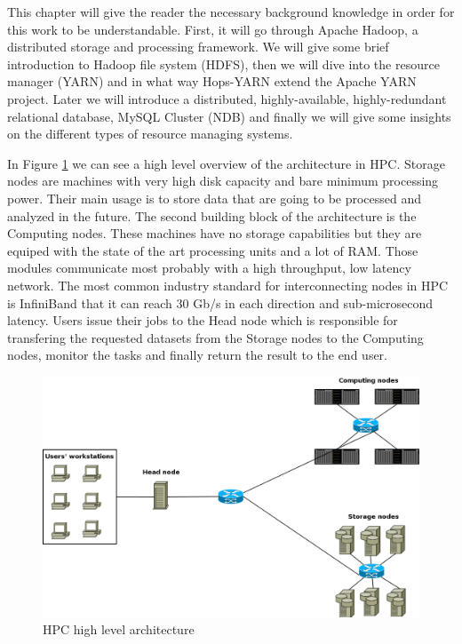 This chapter will give the reader the necessary background knowledge
in order for this work to be understandable. First, it will go through
Apache Hadoop, a distributed storage and processing framework. We will
give some brief introduction to Hadoop file system (HDFS), then we
will dive into the
resource manager (YARN) and in what way Hops-YARN extend the Apache
YARN project. Later we will introduce a distributed, highly-available,
highly-redundant relational database, MySQL Cluster (NDB) and finally
we will give some insights on the different types of resource managing
systems.

In Figure \ref{fig:back_hpc_arch_overview} we can see a high level
overview of the architecture in HPC. Storage nodes are machines with very high disk capacity and bare
minimum processing power. Their main usage is to store data that are
going to be processed and analyzed in the future. The second building
block of the architecture is the Computing nodes. These machines have
no storage capabilities but they are equiped with the state of the art
processing units and a lot of RAM. Those modules communicate most
probably with a high throughput, low latency network. The most common
industry standard for interconnecting nodes in HPC is InfiniBand
\cite{infiniband} that it can
reach 30 Gb/s in each direction and sub-microsecond latency. Users
issue their jobs to the Head node which is responsible for transfering
the requested datasets from the Storage nodes to the Computing nodes,
monitor the tasks and finally return the result to the end user.

\begin{figure}
\centering
\includegraphics[scale=0.35]{resources/images/Background/hpc_arch_overview.png}
\caption{HPC high level architecture}
\label{fig:back_hpc_arch_overview}
\end{figure}

